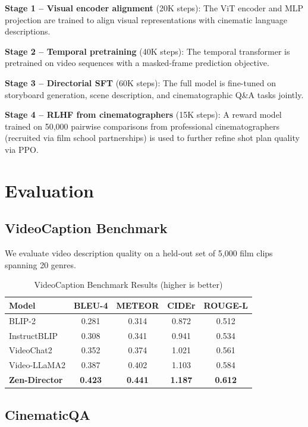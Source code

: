 \documentclass[11pt,a4paper]{article}
\begin{document}
\textbf{Stage 1 -- Visual encoder alignment} (20K steps): The ViT encoder and MLP projection
are trained to align visual representations with cinematic language descriptions.

\textbf{Stage 2 -- Temporal pretraining} (40K steps): The temporal transformer is pretrained
on video sequences with a masked-frame prediction objective.

\textbf{Stage 3 -- Directorial SFT} (60K steps): The full model is fine-tuned on storyboard
generation, scene description, and cinematographic Q\&A tasks jointly.

\textbf{Stage 4 -- RLHF from cinematographers} (15K steps): A reward model trained on 50,000
pairwise comparisons from professional cinematographers (recruited via film school partnerships)
is used to further refine shot plan quality via PPO.

\section{Evaluation}

\subsection{VideoCaption Benchmark}

We evaluate video description quality on a held-out set of 5,000 film clips spanning 20 genres.

\begin{table}[H]
\centering
\begin{tabular}{lcccc}
\toprule
\textbf{Model} & \textbf{BLEU-4} & \textbf{METEOR} & \textbf{CIDEr} & \textbf{ROUGE-L} \\
\midrule
BLIP-2 & 0.281 & 0.314 & 0.872 & 0.512 \\
InstructBLIP & 0.308 & 0.341 & 0.941 & 0.534 \\
VideoChat2 & 0.352 & 0.374 & 1.021 & 0.561 \\
Video-LLaMA2 & 0.387 & 0.402 & 1.103 & 0.584 \\
\textbf{Zen-Director} & \textbf{0.423} & \textbf{0.441} & \textbf{1.187} & \textbf{0.612} \\
\bottomrule
\end{tabular}
\caption{VideoCaption Benchmark Results (higher is better)}
\end{table}

\subsection{CinematicQA}
\end{document}
